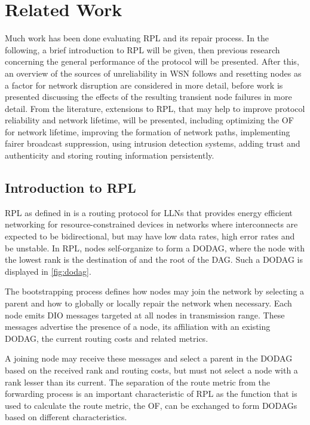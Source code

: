 \chapter{Related Work} %
\label{chap:relwork}

Much work has been done evaluating \ac{RPL} and its repair process.
In the following, a brief introduction to \ac{RPL} will be given, then previous research concerning the general performance of the protocol will be presented.
After this, an overview of the sources of unreliability in \ac{WSN} follows and resetting nodes as a factor for network disruption are considered in more detail, before work is presented discussing the effects of the resulting transient node failures in more detail.
From the literature, extensions to \ac{RPL}, that may help to improve protocol reliability and network lifetime, will be presented, including optimizing the \ac{OF} for network lifetime, improving the formation of network paths, implementing fairer broadcast suppression, using intrusion detection systems, adding trust and authenticity and storing routing information persistently.

\section{Introduction to RPL}

\ac{RPL} as defined in \cite{rfc6550} is a routing protocol for \acp{LLN} that provides energy efficient networking for resource-constrained devices in networks where interconnects are expected to be bidirectional, but may have low data rates, high error rates and be unstable.
In \ac{RPL}, nodes self-organize to form a \ac{DODAG}, where the node with the lowest rank is the destination of and the root of the \ac{DAG}.
Such a \ac{DODAG} is displayed in \autoref{fig:dodag}.

The bootstrapping process defines how nodes may join the network by selecting a parent and how to globally or locally repair the network when necessary.
Each node emits \ac{DIO} messages targeted at all nodes in transmission range.
These messages advertise the presence of a node, its affiliation with an existing \ac{DODAG}, the current routing costs and related metrics.

A joining node may receive these messages and select a parent in the \ac{DODAG}
based on the received rank and routing costs, but must not select a node with a rank lesser than its current.
The separation of the route metric from the forwarding process is an important characteristic of \ac{RPL} as the function that is used to calculate the route metric, the \ac{OF}, can be exchanged to form \acp{DODAG} based on different characteristics.

